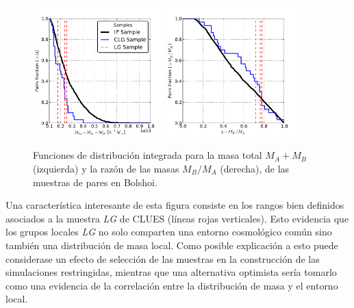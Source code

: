 \begin{figure}[htbp]
	\centering
	\includegraphics[trim = 0mm 0mm 9.5mm 10mm, clip, width=0.45\textwidth]
	{./figures/4_results/IP_IMF.pdf}
	\includegraphics[trim = 0mm 0mm 9.5mm 10mm, clip, width=0.45\textwidth]
	{./figures/4_results/IP_Mass_Ratio.pdf}
	
	\caption{\small{ Funciones de distribución integrada para la masa total
	$M_{A} + M_{B}$ (izquierda) y la razón de las masas $M_B/M_A$ (derecha), 
	de las muestras de pares en Bolshoi. }}
	\label{fig:CLG_Mass}
\end{figure}


Una característica interesante de esta figura consiste en los rangos bien 
definidos asociados a la muestra \textit{LG} de CLUES (líneas rojas 
verticales). Esto evidencia que los grupos locales \textit{LG} no solo 
comparten una entorno cosmológico común sino también una distribución de 
masa local. Como posible explicación a esto puede considerase un efecto de 
selección de las muestras en la construcción de las simu\-laciones 
restringidas, mientras que una alternativa optimista sería tomarlo como 
una evidencia de la correlación entre la distribución de masa y el entorno 
local.


